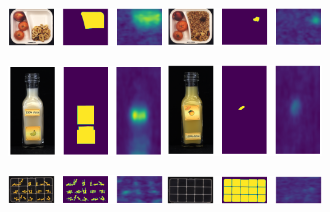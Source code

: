 \begin{figure}[H]
    \captionsetup[subfigure]{justification=centering}
    \centering
    \begin{subfigure}[b]{\textwidth}
        \centering
        \includegraphics[width=0.45\textwidth]{figures/appendix/appendix_simplenet/BB/image_prediction_131.png}
        \hfill
        \includegraphics[width=0.45\textwidth]{figures/appendix/appendix_simplenet/BB/image_prediction_214.png}

    \end{subfigure}
    \begin{subfigure}[b]{\textwidth}
        \centering
        \includegraphics[width=0.45\textwidth]{figures/appendix/appendix_simplenet/JB/image_prediction_165.png}
        \hfill
        \includegraphics[width=0.45\textwidth]{figures/appendix/appendix_simplenet/JB/image_prediction_238.png}

    \end{subfigure}
    \begin{subfigure}[b]{\textwidth}
        \centering
        \includegraphics[width=0.45\textwidth]{figures/appendix/appendix_simplenet/PP/image_prediction_160.png}
        \hfill
        \includegraphics[width=0.45\textwidth]{figures/appendix/appendix_simplenet/PP/image_prediction_195.png}


\end{subfigure}
\end{figure}
